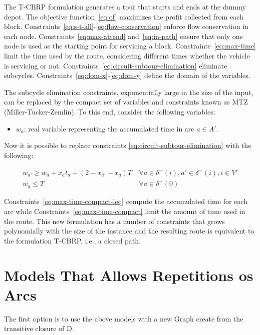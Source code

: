 The T-CBRP formulation generates a tour that starts and ends at the dummy depot. The objective function~\eqref{eq:of} maximizes the profit collected from each block. Constraints~\eqref{eq:s-t-all}-\eqref{eq:flow-conservation} enforce flow conservation in each node. Constraints~\eqref{eq:max-attend} and~\eqref{eq:in-path} ensure that only one node is used as the starting point for servicing a block. Constraints~\eqref{eq:max-time} limit the time used by the route, considering different times whether the vehicle is servicing or not. Constraints~\eqref{eq:circuit-subtour-elimination} eliminate subcycles. Constraints~\eqref{eq:dom-x}-\eqref{eq:dom-y} define the domain of the variables.

The subcycle elimination constraints, exponentially large in the size of the input, 
can be replaced by the compact set of variables and constraints known as MTZ (Miller-Tucker-Zemlin). To this end, consider the following variables:

\begin{itemize}
    \item $w_{a}$: real variable representing the accumulated time in arc $a \in A'$.
\end{itemize}

Now it is possible to replace constraints \eqref{eq:circuit-subtour-elimination} with the following:

\begin{align}
  & w_{a'} \geq w_{a} + x_{a}t_{a} - (2 - x_{a'} - x_{a})T & \ \forall a \in \delta^{+}(i), a' \in \delta^{-}(i), i \in V' \label{eq:max-time-compact-leq} \\
   & w_{a} \leq T & \ \forall a \in \delta^{+}(0) & \label{eq:max-time-compact}
\end{align}

Constraints~\eqref{eq:max-time-compact-leq} compute the accumulated time for each arc while  Constraints~\eqref{eq:max-time-compact} limit the amount of time used in the route. This new formulation has a number of constraints that grows polynomially with the size of the instance and the resulting route is equivalent to the formulation T-CBRP, i.e., a closed path.

\section{Models That Allows Repetitions os Arcs}

The first option is to use the above models with a new Graph create from the transitive closure of D.

